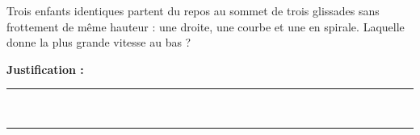 Trois enfants identiques partent du repos au sommet de trois glissades sans frottement de même hauteur : une droite, une courbe et une en spirale. Laquelle donne la plus grande vitesse au bas ?

\choices

\noindent\textbf{Justification :} \hrulefill \\[2.5ex]
\rule{\linewidth}{0.4pt} \\[2.5ex]
\rule{\linewidth}{0.4pt}
\vfill
